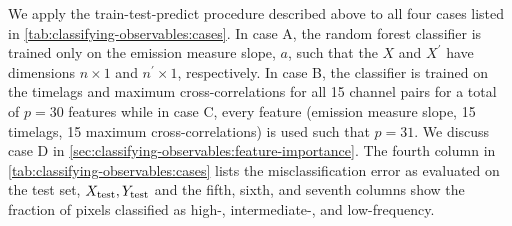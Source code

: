 We apply the train-test-predict procedure described above to all four cases listed in \autoref{tab:classifying-observables:cases}. In case A, the random forest classifier is trained only on the emission measure slope, $a$, such that the $X$ and $X^\prime$ have dimensions $n\times1$ and $n^\prime\times1$, respectively. In case B, the classifier is trained on the timelags and maximum cross-correlations for all 15 channel pairs for a total of $p=30$ features while in case C, every feature (emission measure slope, 15 timelags, 15 maximum cross-correlations) is used such that $p=31$. We discuss case D in \autoref{sec:classifying-observables:feature-importance}. The fourth column in \autoref{tab:classifying-observables:cases} lists the misclassification error as evaluated on the test set, $X_\textup{test},Y_\textup{test}$ and the fifth, sixth, and seventh columns show the fraction of pixels classified as high-, intermediate-, and low-frequency.

